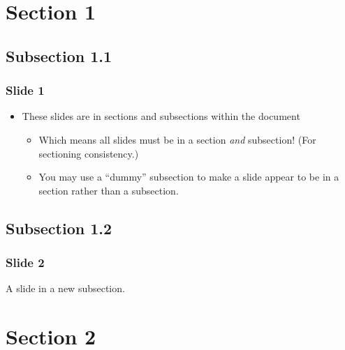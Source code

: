 
\section*{%
  Section 1}



\subsection*{%
  Subsection 1.1}

\begin{frame}[fragile]
\frametitle{Slide 1}

\begin{itemize}[<+-| alert@+>]

\item These slides are in sections and subsections within the document
\begin{itemize}[<+-| alert@+>]

\item Which means all slides must be in a section
\emph{and} subsection! (For sectioning consistency.)

\item You may use a ``dummy'' subsection to make a slide appear to be in a
section rather than a subsection.
\end{itemize}
\end{itemize}
\end{frame}



\subsection*{%
  Subsection 1.2}

\begin{frame}[fragile]
\frametitle{Slide 2}


A slide in a new subsection.
\end{frame}



\section*{%
  Section 2}


